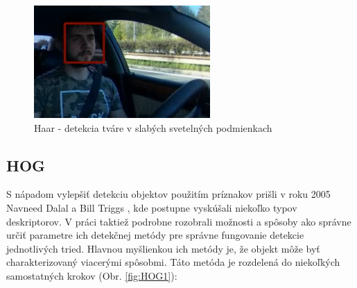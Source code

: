 \documentclass[slovak,master,dept460,male,cpp,cpdeclaration]{diploma}
\begin{document}
\begin{figure}[H]
	\centering
	\includegraphics[width=0.6\textwidth]{Figures/haar2.png}
	\caption{Haar - detekcia tváre v slabých svetelných podmienkach}
	\label{fig:Haar2}
\end{figure}



\subsection{HOG}
\label{HOG}
S nápadom  vylepšiť detekciu objektov použitím príznakov prišli v roku 2005 Navneed Dalal a Bill Triggs \cite{dalal2005}, kde postupne vyskúšali niekoľko typov deskriptorov.  V práci taktiež podrobne rozobrali  možnosti a spôsoby ako správne určiť parametre ich detekčnej metódy pre správne fungovanie detekcie jednotlivých tried. Hlavnou myšlienkou ich metódy je, že objekt môže byť charakterizovaný  viacerými spôsobmi. Táto metóda je rozdelená do niekoľkých samostatných krokov (Obr. \ref{fig:HOG1}):
\end{document}
